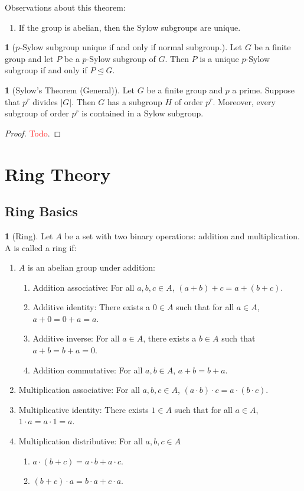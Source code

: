 \documentclass[12pt]{article}
\theoremstyle{definition}
\newtheorem{definition}{\color{NavyBlue}{\textbf{Definition}}}
\newtheorem{theorem}{\color{ForestGreen}{\textbf{Theorem}}}
\newtheorem{corollary}{\color{ForestGreen}{\textbf{Corollary}}}
\theoremstyle{definition}
\begin{document}
Observations about this theorem:
\begin{enumerate}
	\item If the group is abelian, then the Sylow subgroups are unique.
\end{enumerate}

\begin{corollary}[$p$-Sylow subgroup unique if and only if normal subgroup.]
	Let $G$ be a finite group and let $P$ be a $p$-Sylow subgroup of $G$. Then $P$ is a unique $p$-Sylow subgroup if and only if $P \trianglelefteq G$. 
\end{corollary}

\begin{theorem}[Sylow's Theorem (General)]
	Let $G$ be a finite group and $p$ a prime. Suppose that $p^r$ divides $|G|$. Then $G$ has a subgroup $H$ of order $p^r$. Moreover, every subgroup of order $p^r$ is contained in a Sylow subgroup. 
\end{theorem}
\begin{proof}
	\textcolor{red}{Todo}.
\end{proof}

\section{Ring Theory}
\subsection{Ring Basics}
\begin{definition}[Ring]
Let $A$ be a set with two binary operations: addition and multiplication. A is called a ring if:
\begin{enumerate}
	\item $A$ is an abelian group under addition:
	\begin{enumerate}
		\item Addition associative: For all $a,b,c \in A$, $(a+b) + c = a + (b+c)$.
		\item Additive identity: There exists a $0 \in A$ such that for all $a \in A$, $a + 0 = 0 + a = a$. 
		\item Additive inverse: For all $a \in A$, there exists a $b \in A$ such that $a + b = b + a = 0$. 
		\item Addition commutative: For all $a,b \in A$, $a + b = b + a$.
	\end{enumerate}
	\item Multiplication associative: For all $a,b,c \in A$, $(a \cdot b) \cdot c = a \cdot (b \cdot c)$. 
	\item Multiplicative identity: There exists $1 \in A$ such that for all $a \in A$, $1 \cdot a = a \cdot 1 = a$.
	\item Multiplication distributive: For all $a,b,c \in A$
	\begin{enumerate}
		\item $a \cdot (b + c) = a\cdot b + a \cdot c$.
		\item $(b + c) \cdot a = b\cdot a + c \cdot a$.
	\end{enumerate}
\end{enumerate}
\end{definition}
\end{document}
